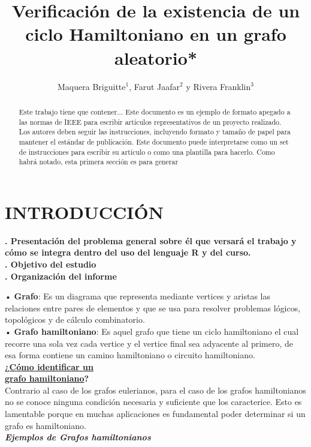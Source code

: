 \documentclass[journal]{IEEEtran}
\title{\LARGE \bf
		Verificaci{\'o}n de la existencia de un ciclo Hamiltoniano en un grafo aleatorio*}
\author{Maquera Briguitte$^{1}$, Farut Jaafar$^{2}$ y Rivera Franklin$^{3}$}
\begin{document}
\maketitle
\thispagestyle{empty}
\pagestyle{empty}



\begin{abstract}
	
	Este trabajo tiene que contener...
	Este documento es un ejemplo de formato apegado a
	las normas de IEEE para escribir art{\'i}culos representativos de un
	proyecto realizado. Los autores deben seguir las instrucciones,
	incluyendo formato y tamaño de papel para mantener el
	estándar de publicaci{\'o}n. Este documento puede interpretarse
	como un set de instrucciones para escribir su art{\'i}culo o como una
	plantilla para hacerlo. Como habrá notado, esta primera secci{\'o}n
	es para generar 

\end{abstract}

	
\section{INTRODUCCI{\'O}N}

{\bf . Presentaci{\'o}n del problema general sobre {\'e}l que versar{\'a} el trabajo y c{\'o}mo se integra dentro del uso del lenguaje R y del curso.\\
. Objetivo del estudio\\
. Organización del informe\\ }

\vspace{0.5cm}
• \textbf{Grafo}: Es un diagrama que representa mediante vertices y aristas las relaciones entre pares de elementos y que se usa para resolver problemas l{\'o}gicos, topol{\'o}gicos y de c{\'a}lculo combinatorio.\\

\vspace{1cm}
• \textbf{Grafo hamiltoniano}: Es aquel grafo que tiene un ciclo hamiltoniano el cual recorre una sola vez cada vertice y el vertice final sea adyacente al primero, de esa forma contiene un camino hamiltoniano o circuito hamiltoniano.\\
\textbf{¿\underline{C{\'o}mo identificar un}}\\
\textbf{\underline{grafo hamiltoniano}?}\\
Contrario al caso de los grafos eulerianos, para el caso de los grafos hamiltonianos no se conoce ninguna condici{\'o}n necesaria y suficiente que los caracterice. Esto es lamentable porque en muchas aplicaciones es fundamental poder determinar si un grafo es hamiltoniano.\\
\textit{\textbf{Ejemplos de Grafos hamiltonianos}}\\
\end{document}
